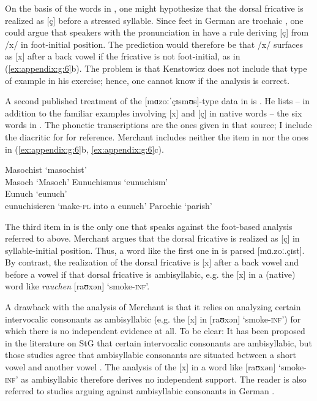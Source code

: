 On the basis of the words in , one might hypothesize that the dorsal fricative is realized as [ç] before a stressed syllable. Since feet in German are trochaic \citep{Féry1998}, one could argue that speakers with the pronunciation in  have a rule deriving [ç] from /x/ in foot-initial position. The prediction would therefore be that /x/ surfaces as [x] after a back vowel if the fricative is not foot-initial, as in (\ref{ex:appendix:g:6}b). The problem is that Kenstowicz does not include that type of example in his exercise; hence, one cannot know if the analysis is correct.

A second published treatment of the [mɑzoːˈçɪsmʊs]-type data in  is \citet[711]{Merchant1996}. He lists -- in addition to the familiar examples involving [x] and [ç] in native words -- the six words in . The phonetic transcriptions are the ones given in that source; I include the diacritic for  for reference. Merchant includes neither the item in  nor the ones in (\ref{ex:appendix:g:6}b, \ref{ex:appendix:g:6}c).

\ea \label{ex:appendix:g:8}
\ea \label{ex:appendix:g:8a}
 \tab Masochist \tab ‘masochist’\\
    \relax [ˈmɑzoːx] \tab Masoch \tab ‘Masoch’
\ex \label{ex:appendix:g:8b}
    \relax [oɪnuːˈçɪsmus] \tab Eunuchismus \tab ‘eunuchism’\\
    \relax [ɔyˈnuːx] \tab Eunuch \tab ‘eunuch’\\
    \relax [ɔynuːçɪˈziːrən] \tab eunuchisieren \tab ‘make-\textsc{pl} into a eunuch’
\ex  \label{ex:appendix:g:8c}
\relax [paroːˈçiː] \tab Parochie \tab ‘parish’
\z
\z

The third item in  is the only one that speaks against the foot-based analysis referred to above. Merchant argues that the dorsal fricative is realized as [ç] in syllable-initial position. Thus, a word like the first one in  is parsed [mɑ.zoː.çɪst]. By contrast, the realization of the dorsal fricative is [x] after a back vowel and before a vowel if that dorsal fricative is ambisyllabic, e.g. the [x] in a (native) word like \textit{rauchen} [raʊxən] ‘smoke-\textsc{inf}’.

A drawback with the analysis of Merchant is that it relies on analyzing certain intervocalic consonants as ambisyllabic (e.g. the [x] in [raʊxən] ‘smoke-\textsc{inf}’) for which there is no independent evidence at all. To be clear: It has been proposed in the literature on StG that certain intervocalic consonants are ambisyllabic, but those studies agree that ambisyllabic consonants are  situated between a short vowel and another vowel \citep{Wiese1996a}. The analysis of the [x] in a word like [raʊxən] ‘smoke-\textsc{inf}’ as ambisyllabic therefore derives no independent support. The reader is also referred to studies arguing against ambisyllabic consonants in German \citep{Jensen2000}.




